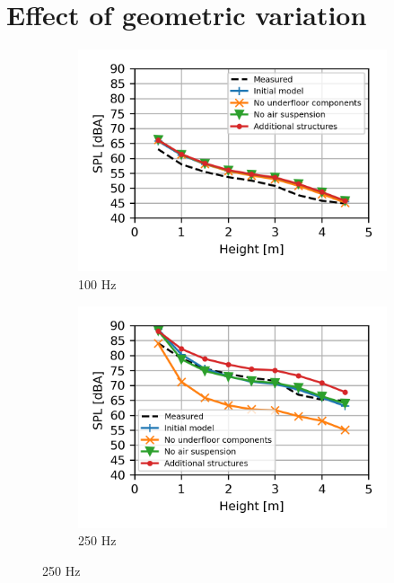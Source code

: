 \section{Effect of geometric variation}

\begin{figure}[H]
	\centering
	\begin{subfigure}[b]{0.49\textwidth}
		\centering
		\includegraphics{fig/chap5/geometry_variation/third_octave_over_height/100_Hz.png}
		\caption{100 Hz}
	\end{subfigure}
	\begin{subfigure}[b]{0.49\textwidth}
		\centering
		\includegraphics{fig/chap5/geometry_variation/third_octave_over_height/250_Hz.png}
		\caption{250 Hz}
	\end{subfigure}

\end{figure}
